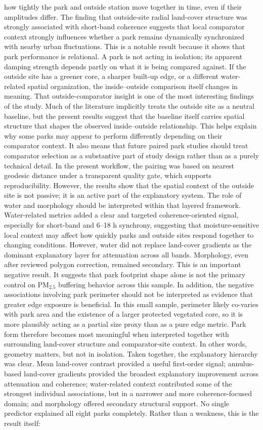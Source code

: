 how tightly the park and outside station move together in time, even if their amplitudes differ. The finding that outside-site radial land-cover structure was strongly associated with short-band coherence suggests that local comparator context strongly influences whether a park remains dynamically synchronized with nearby urban fluctuations. This is a notable result because it shows that park performance is relational. A park is not acting in isolation; its apparent damping strength depends partly on what it is being compared against. If the outside site has a greener core, a sharper built-up edge, or a different water-related spatial organization, the inside--outside comparison itself changes in meaning. That outside-comparator insight is one of the most interesting findings of the study. Much of the literature implicitly treats the outside site as a neutral baseline, but the present results suggest that the baseline itself carries spatial structure that shapes the observed inside--outside relationship. This helps explain why some parks may appear to perform differently depending on their comparator context. It also means that future paired park studies should treat comparator selection as a substantive part of study design rather than as a purely technical detail. In the present workflow, the pairing was based on nearest geodesic distance under a transparent quality gate, which supports reproducibility. However, the results show that the spatial context of the outside site is not passive; it is an active part of the explanatory system. The role of water and morphology should be interpreted within that layered framework. Water-related metrics added a clear and targeted coherence-oriented signal, especially for short-band and 6--18 h synchrony, suggesting that moisture-sensitive local context may affect how quickly parks and outside sites respond together to changing conditions. However, water did not replace land-cover gradients as the dominant explanatory layer for attenuation across all bands. Morphology, even after reviewed polygon correction, remained secondary. This is an important negative result. It suggests that park footprint shape alone is not the primary control on PM$_{2.5}$ buffering behavior across this sample. In addition, the negative associations involving park perimeter should not be interpreted as evidence that greater edge exposure is beneficial. In this small sample, perimeter likely co-varies with park area and the existence of a larger protected vegetated core, so it is more plausibly acting as a partial size proxy than as a pure edge metric. Park form therefore becomes most meaningful when interpreted together with surrounding land-cover structure and comparator-site context. In other words, geometry matters, but not in isolation. Taken together, the explanatory hierarchy was clear. Mean land-cover contrast provided a useful first-order signal; annulus-based land-cover gradients provided the broadest explanatory improvement across attenuation and coherence; water-related context contributed some of the strongest individual associations, but in a narrower and more coherence-focused domain; and morphology offered secondary structural support. No single predictor explained all eight parks completely. Rather than a weakness, this is the result itself: 
